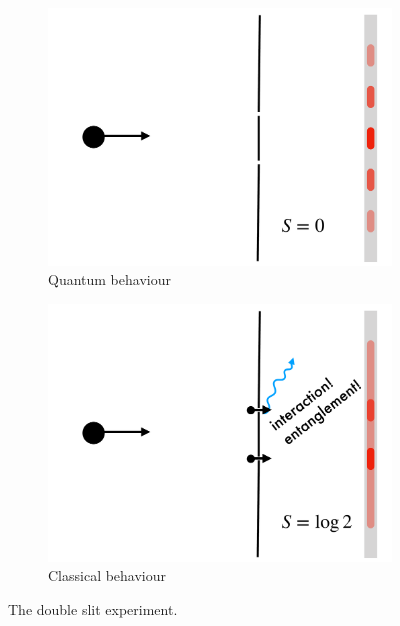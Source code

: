 \begin{figure}[bt]
\begin{subfigure}[t]{0.48\textwidth}
    \centering
    \begin{framed}
    \centering
    \includegraphics[width=\linewidth]{Figures/quantum}
    \caption{Quantum behaviour}
    \label{fig.quantum}
    \end{framed}
\end{subfigure}
\hfill
\begin{subfigure}[t]{0.48\textwidth}
    \centering
    \begin{framed}
    \centering
    \includegraphics[width=\linewidth]{Figures/classical}
    \caption{Classical behaviour}
    \label{fig.classical}
    \end{framed}
\end{subfigure}
\caption{The double slit experiment.\label{fig.universeparts}}
\end{figure}

